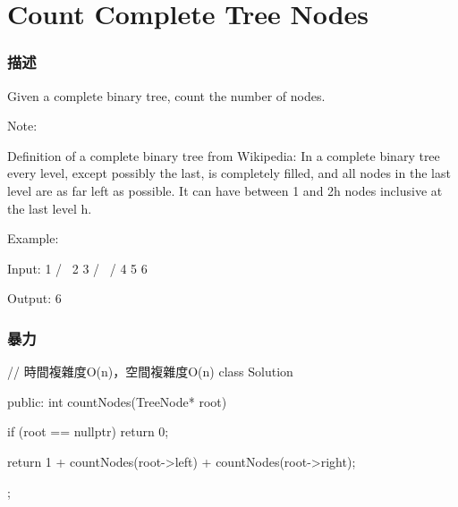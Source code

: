 \section{Count Complete Tree Nodes} %
\label{sec:count-complete-tree-nodes}


\subsubsection{描述}
Given a complete binary tree, count the number of nodes.

Note:

Definition of a complete binary tree from Wikipedia:
In a complete binary tree every level, except possibly the last, is completely filled, and all nodes in the last level are as far left as possible. It can have between 1 and 2h nodes inclusive at the last level h.

Example:
\begin{Code}
Input:
    1
   / \
  2   3
 / \  /
4  5 6

Output: 6
\end{Code}


\subsubsection{暴力}
\begin{Code}
// 時間複雜度O(n)，空間複雜度O(n)
class Solution {
public:
    int countNodes(TreeNode* root) {
        if (root == nullptr) return 0;

        return 1 + countNodes(root->left) + countNodes(root->right);
    }
};
\end{Code}

